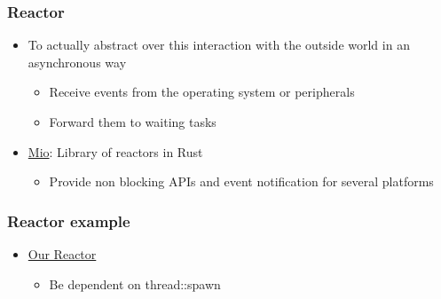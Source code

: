 \begin{frame}[fragile]
    \frametitle{Reactor}
% 
% 
    \begin{itemize}
        \item To actually abstract over this interaction with the outside world in an asynchronous way
    	\begin{itemize}
    	    \item Receive events from the operating system or peripherals
    	    \item Forward them to waiting tasks
    	\end{itemize}

        \item \href{https://github.com/tokio-rs/mio}{Mio}: Library of reactors in Rust
    	\begin{itemize}
    	    \item Provide non blocking APIs and event notification for several platforms
    	\end{itemize}
    \end{itemize}

\end{frame}
\begin{frame}[fragile]
    \frametitle{Reactor example}
% 
% 
    \begin{itemize}
        \item \href{https://cfsamson.github.io/books-futures-explained/6_future_example.html#the-reactor}{Our Reactor}
    	\begin{itemize}
    	    \item Be dependent on thread::spawn
    	\end{itemize}
    \end{itemize}

\end{frame}
